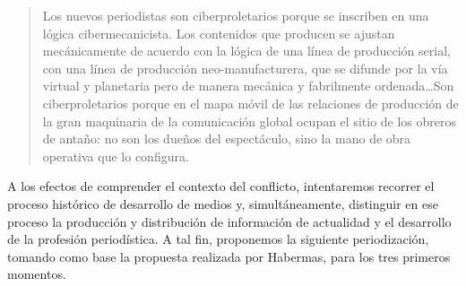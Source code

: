 \begin{quote}
Los nuevos periodistas son ciberproletarios porque se inscriben en una lógica cibermecanicista. Los contenidos que producen se ajustan mecánicamente de acuerdo con la lógica de una línea de producción serial, con una línea de producción neo-manufacturera, que se difunde por la vía virtual y planetaria pero de manera mecánica y fabrilmente ordenada\ldots Son ciberproletarios porque en el mapa móvil de las relaciones de producción de la gran maquinaria de la comunicación global ocupan el sitio de los obreros de antaño: no son los dueños del espectáculo, sino la mano de obra operativa que lo configura.
\end{quote}

A los efectos de comprender el contexto del conflicto, intentaremos recorrer el proceso histórico de desarrollo de medios y, simultáneamente, distinguir en ese proceso la producción y distribución de información de actualidad y el desarrollo de la profesión periodística. A tal fin, proponemos la siguiente periodización, tomando como base la propuesta realizada por Habermas, para los tres primeros momentos.

